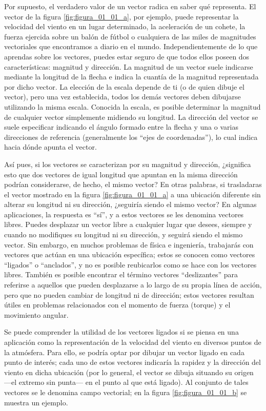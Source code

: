 \documentclass[hidelinks,12pt]{article}
\begin{document}
Por supuesto, el verdadero valor de un vector radica en saber qué representa. El vector de la figura \ref{fig:figura_01_01_a}, por ejemplo, puede representar la velocidad del viento en un lugar determinado, la aceleración de un cohete, la fuerza ejercida sobre un balón de fútbol o cualquiera de las miles de magnitudes vectoriales que encontramos a diario en el mundo. Independientemente de lo que aprendas sobre los vectores, puedes estar seguro de que todos ellos poseen dos características: magnitud y dirección. La magnitud de un vector suele indicarse mediante la longitud de la flecha e indica la cuantía de la magnitud representada por dicho vector. La elección de la escala depende de ti (o de quien dibuje el vector), pero una vez establecida, todos los demás vectores deben dibujarse utilizando la misma escala. Conocida la escala, es posible determinar la magnitud de cualquier vector simplemente midiendo su longitud. La dirección del vector se suele especificar indicando el ángulo formado entre la flecha y una o varias direcciones de referencia (generalmente los \enquote{ejes de coordenadas}), lo cual indica hacia dónde apunta el vector.
\par
Así pues, si los vectores se caracterizan por su magnitud y dirección, ¿significa esto que dos vectores de igual longitud que apuntan en la misma dirección podrían considerarse, de hecho, el mismo vector? En otras palabras, si trasladaras el vector mostrado en la figura \ref{fig:figura_01_01_a} a una ubicación diferente sin alterar su longitud ni su dirección, ¿seguiría siendo el mismo vector? En algunas aplicaciones, la respuesta es \enquote{sí}, y a estos vectores se les denomina vectores libres. Puedes desplazar un vector libre a cualquier lugar que desees, siempre y cuando no modifiques su longitud ni su dirección, y seguirá siendo el mismo vector. Sin embargo, en muchos problemas de física e ingeniería, trabajarás con vectores que actúan en una ubicación específica; estos se conocen como vectores \enquote{ligados} o \enquote{anclados}, y no es posible reubicarlos como se hace con los vectores libres. También es posible encontrar el término vectores \enquote{deslizantes} para referirse a aquellos que pueden desplazarse a lo largo de su propia línea de acción, pero que no pueden cambiar de longitud ni de dirección; estos vectores resultan útiles en problemas relacionados con el momento de fuerza (torque) y el movimiento angular.
\par
Se puede comprender la utilidad de los vectores ligados si se piensa en una aplicación como la representación de la velocidad del viento en diversos puntos de la atmósfera. Para ello, se podría optar por dibujar un vector ligado en cada punto de interés; cada uno de estos vectores indicaría la rapidez y la dirección del viento en dicha ubicación (por lo general, el vector se dibuja situando su origen —el extremo sin punta— en el punto al que está ligado). Al conjunto de tales vectores se le denomina campo vectorial; en la figura \ref{fig:figura_01_01_b} se muestra un ejemplo.
\end{document}
